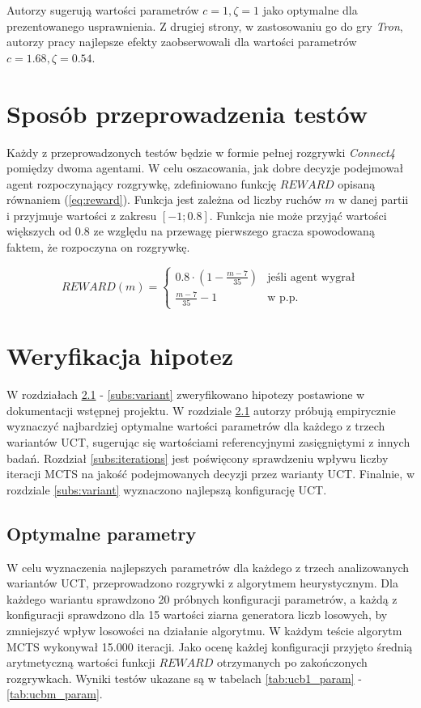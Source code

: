 \documentclass[a4paper,12pt]{article}
\let\oldsection\section
\renewcommand\section{\clearpage\oldsection}
\newcommand{\twopartdef}[3]
{
	\left\{
	\begin{array}{ll}
		#1 & \mbox{jeśli agent wygrał} #2 \\
		#3 & \mbox{w p.p. } 
	\end{array}
	\right.
}
\begin{document}
Autorzy \cite{ucbv} sugerują wartości parametrów $c=1, \zeta=1$ jako optymalne dla prezentowanego usprawnienia. Z drugiej strony, w zastosowaniu go do gry \textit{Tron}, autorzy pracy \cite{tron} najlepsze efekty zaobserwowali dla wartości parametrów $c=1.68, \zeta = 0.54$.


\section{Sposób przeprowadzenia testów}
Każdy z przeprowadzonych testów będzie w formie pełnej rozgrywki \textit{Connect4} pomiędzy dwoma agentami. W celu oszacowania, jak dobre decyzje podejmował agent rozpoczynający rozgrywkę, zdefiniowano funkcję $REWARD$ opisaną równaniem (\ref{eq:reward}). Funkcja jest zależna od liczby ruchów $m$ w danej partii i przyjmuje wartości z zakresu $[-1; 0.8]$. Funkcja nie może przyjąć wartości większych od $0.8$ ze względu na przewagę pierwszego gracza spowodowaną faktem, że rozpoczyna on rozgrywkę.

\begin{equation} \label{eq:reward}
	REWARD(m) = \twopartdef { 0.8 \cdot (1 - \frac{m-7}{35}) } {} {\frac{m-7}{35} - 1}
\end{equation}


\section{Weryfikacja hipotez}
W rozdziałach \ref{subs:params} - \ref{subs:variant} zweryfikowano hipotezy postawione w dokumentacji wstępnej projektu. W rozdziale \ref{subs:params} autorzy próbują empirycznie wyznaczyć najbardziej optymalne wartości parametrów dla każdego z trzech wariantów UCT, sugerując się wartościami referencyjnymi zasięgniętymi z innych badań. Rozdział \ref{subs:iterations} jest poświęcony sprawdzeniu wpływu liczby iteracji MCTS na jakość podejmowanych decyzji przez warianty UCT. Finalnie, w rozdziale \ref{subs:variant} wyznaczono najlepszą konfigurację UCT.


\subsection{Optymalne parametry} \label{subs:params}
W celu wyznaczenia najlepszych parametrów dla każdego z trzech analizowanych wariantów UCT, przeprowadzono rozgrywki z algorytmem heurystycznym. Dla każdego wariantu sprawdzono 20 próbnych konfiguracji parametrów, a każdą z konfiguracji sprawdzono dla 15 wartości ziarna generatora liczb losowych, by zmniejszyć wpływ losowości na działanie algorytmu. W każdym teście algorytm MCTS wykonywał 15.000 iteracji. Jako ocenę każdej konfiguracji przyjęto średnią arytmetyczną wartości funkcji $REWARD$ otrzymanych po zakończonych rozgrywkach. Wyniki testów ukazane są w tabelach \ref{tab:ucb1_param} - \ref{tab:ucbm_param}.
\end{document}
